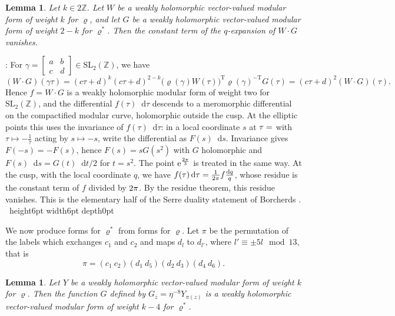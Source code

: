 \documentclass[leqno]{article}
\newcommand{\Z}{\ensuremath{\mathbb{Z}}}
\newcommand{\qed}{\hfill \vrule height6pt  width6pt depth0pt}
\let\i\relax
\newcommand{\i}{\mathrm{i}}
\renewcommand{\d}{\mathop{}\mathopen{}\mathrm{d}}
\newcommand{\e}{\mathrm{e}}
\renewcommand{\d}{\mathop{}\mathopen{}\mathrm{d}}
\newtheorem{lemma}[thm]{Lemma}
\newenvironment{proof}[1][]{\noindent {\it Proof #1} : }{\hbox{~}\qed
\smallskip
}
\numberwithin{equation}{section}
\begin{document}
\begin{lemma}
\label{lem:residue}
Let $k \in 2\Z$. Let $W$ be a weakly holomorphic vector-valued modular form of weight $k$ for $\varrho$, and let $G$ be a weakly holomorphic vector-valued modular form of weight $2-k$ for $\varrho^*$. Then the constant term of the $q$-expansion of $W \cdot G$ vanishes.
\end{lemma}

\begin{proof}
For $\gamma = \begin{bmatrix}a&b\\c&d\end{bmatrix} \in \mathrm{SL}_2(\Z)$, we have
\[
(W \cdot G)(\gamma\tau) = (c\tau+d)^{k}(c\tau+d)^{2-k}\big(\varrho(\gamma)W(\tau)\big)^{\mathrm T}\varrho(\gamma)^{-\mathrm T}G(\tau) = (c\tau+d)^2(W \cdot G)(\tau).
\]
Hence $f = W \cdot G$ is a weakly holomorphic modular form of weight two for $\mathrm{SL}_2(\Z)$, and the differential $f(\tau)\d\tau$ descends to a meromorphic differential on the compactified modular curve, holomorphic outside the cusp. At the elliptic points this uses the invariance of $f(\tau)\d\tau$: in a local coordinate $s$ at $\tau = \i$ with $\tau \mapsto -\frac{1}{\tau}$ acting by $s \mapsto -s$, write the differential as $F(s)\d s$. Invariance gives $F(-s) = -F(s)$, hence $F(s) = sG(s^2)$ with $G$ holomorphic and $F(s)\d s = G(t)\d t/2$ for $t = s^2$. The point $\e^{\frac{2\pi\i}{3}}$ is treated in the same way. At the cusp, with the local coordinate $q$, we have $f(\tau)\d\tau = \frac{1}{2\pi\i}f \frac{\d q}{q}$, whose residue is the constant term of $f$ divided by $2\pi\i$. By the residue theorem, this residue vanishes. This is the elementary half of the Serre duality statement of Borcherds \cite[Theorem 3.1 p.~5]{Bor99}.
\end{proof}

We now produce forms for $\varrho^*$ from forms for $\varrho$. Let $\pi$ be the permutation of the labels which exchanges $c_1$ and $c_2$ and maps $d_l$ to $d_{l'}$, where $l' \equiv \pm 5l \mod 13$, that is
\begin{equation}
\label{eq:pi}
\pi = (c_1\ c_2)(d_1\ d_5)(d_2\ d_3)(d_4\ d_6).
\end{equation}

\begin{lemma}
\label{lem:dual-forms}
Let $Y$ be a weakly holomorphic vector-valued modular form of weight $k$ for $\varrho$. Then the function $G$ defined by $G_z = \eta^{-8}Y_{\pi(z)}$ is a weakly holomorphic vector-valued modular form of weight $k-4$ for $\varrho^*$.
\end{lemma}
\end{document}
